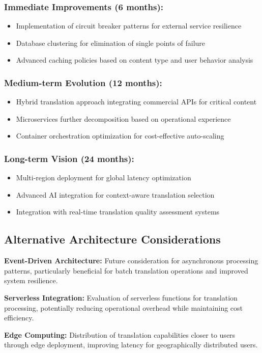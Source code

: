 \subsubsection{Immediate Improvements (6 months):}
\begin{itemize}
    \item Implementation of circuit breaker patterns for external service resilience
    \item Database clustering for elimination of single points of failure
    \item Advanced caching policies based on content type and user behavior analysis
\end{itemize}

\subsubsection{Medium-term Evolution (12 months):}
\begin{itemize}
    \item Hybrid translation approach integrating commercial APIs for critical content
    \item Microservices further decomposition based on operational experience
    \item Container orchestration optimization for cost-effective auto-scaling
\end{itemize}

\subsubsection{Long-term Vision (24 months):}
\begin{itemize}
    \item Multi-region deployment for global latency optimization
    \item Advanced AI integration for context-aware translation selection
    \item Integration with real-time translation quality assessment systems
\end{itemize}

\subsection{Alternative Architecture Considerations}

\textbf{Event-Driven Architecture:} Future consideration for asynchronous processing patterns, particularly beneficial for batch translation operations and improved system resilience.

\textbf{Serverless Integration:} Evaluation of serverless functions for translation processing, potentially reducing operational overhead while maintaining cost efficiency.

\textbf{Edge Computing:} Distribution of translation capabilities closer to users through edge deployment, improving latency for geographically distributed users.